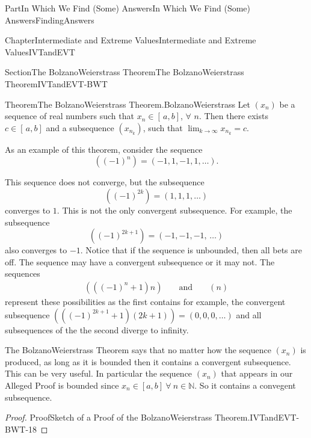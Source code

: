 \documentclass[oneside,10pt,]{book}
\numberwithin{equation}{part}
\def\limit#1#2#3{{\displaystyle\lim_{#1\rightarrow #2}#3}}
\newcommand{\NN}{\mathbb {N}}
\newcommand{\amp}{&}
\begin{document}
\begin{partptx}{Part}{In Which We Find (Some) Answers}{}{In Which We Find (Some) Answers}{}{}{FindingAnswers}
\begin{chapterptx}{Chapter}{Intermediate and Extreme Values}{}{Intermediate and Extreme Values}{}{}{IVTandEVT}
\begin{sectionptx}{Section}{The Bolzano\textendash{}Weierstrass Theorem}{}{The Bolzano\textendash{}Weierstrass Theorem}{}{}{IVTandEVT-BWT}
\begin{theorem}{Theorem}{The Bolzano\textendash{}Weierstrass Theorem.}{}{BolzanoWeierstrass}
%
Let \(\left(x_n\right)\) be a sequence of real numbers such that \(x_n\in[\,a,b]\), \(\forall\) \(n\).  Then there exists \(c\in[\,a,b]\) and a subsequence \(\left(x_{n_k}\right)\), such that \(\limit{k}{\infty}{x_{n_k}}=c\).%
\end{theorem}
As an example of this theorem, consider the sequence%
\begin{equation*}
\left((-1)^n\right)=\left(-1,1,-1,1,\ldots\right) \text{.}
\end{equation*}
%
\par
This sequence does not converge, but the subsequence%
\begin{equation*}
\left((-1)^{2k}\right)=\left(1,1,1,\ldots\right)
\end{equation*}
converges to \(1\).  This is not the only convergent subsequence. For example, the subsequence%
\begin{equation*}
\left((-1)^{2k+1}\right)=(-1,-1,-1,\,\ldots)
\end{equation*}
also converges to \(-1\).  Notice that if the sequence is unbounded, then all bets are off. The sequence may have a convergent subsequence or it may not.  The sequences%
\begin{align*}
\left(\left((-1)^n+1\right)n\right) \amp{}\amp{}\text{ and }
\amp{}\amp{}\left(n\right)
\end{align*}
represent these possibilities as the first contains for example, the convergent subsequence \(\left(\left((-1)^{2k+1}+1\right)(2k+1)\right)=(0,0,0,\ldots)\) and all subsequences of the the second diverge to infinity.%
\par
The Bolzano\textendash{}Weierstrass Theorem says that no matter how the sequence \(\left(x_n\right)\) is produced, as long as it is bounded then it contains a  convergent subsequence. This can be very useful. In particular the sequence \((x_n)\) that appears in our Alleged Proof is bounded since \(x_n\in [a,b]\  \forall \ n\in\NN\). So it contains a convegent subsequence.%
\begin{proof}{Proof}{Sketch of a Proof of the Bolzano\textendash{}Weierstrass Theorem.}{IVTandEVT-BWT-18}

\end{proof}
\end{sectionptx}
\end{chapterptx}
\end{partptx}
\end{document}

